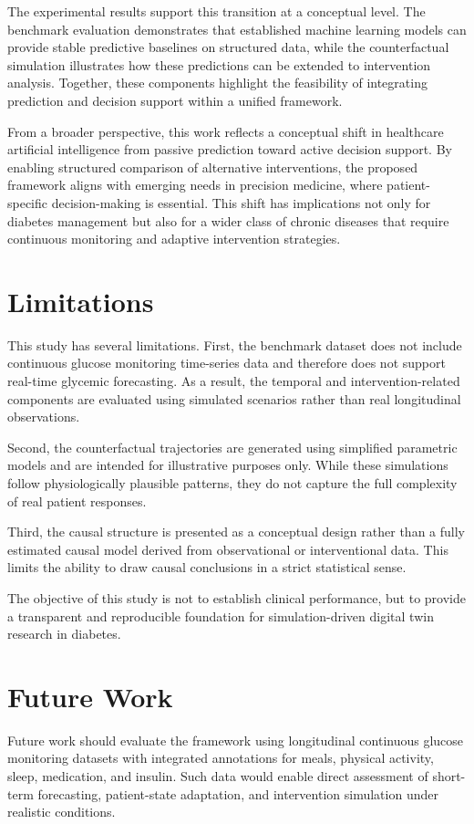 \documentclass[journal]{IEEEtran}
\begin{document}
The experimental results support this transition at a conceptual level. The benchmark evaluation demonstrates that established machine learning models can provide stable predictive baselines on structured data, while the counterfactual simulation illustrates how these predictions can be extended to intervention analysis. Together, these components highlight the feasibility of integrating prediction and decision support within a unified framework.

From a broader perspective, this work reflects a conceptual shift in healthcare artificial intelligence from passive prediction toward active decision support. By enabling structured comparison of alternative interventions, the proposed framework aligns with emerging needs in precision medicine, where patient-specific decision-making is essential. This shift has implications not only for diabetes management but also for a wider class of chronic diseases that require continuous monitoring and adaptive intervention strategies.

\section{Limitations}
This study has several limitations. First, the benchmark dataset does not include continuous glucose monitoring time-series data and therefore does not support real-time glycemic forecasting. As a result, the temporal and intervention-related components are evaluated using simulated scenarios rather than real longitudinal observations.

Second, the counterfactual trajectories are generated using simplified parametric models and are intended for illustrative purposes only. While these simulations follow physiologically plausible patterns, they do not capture the full complexity of real patient responses.

Third, the causal structure is presented as a conceptual design rather than a fully estimated causal model derived from observational or interventional data. This limits the ability to draw causal conclusions in a strict statistical sense.

The objective of this study is not to establish clinical performance, but to provide a transparent and reproducible foundation for simulation-driven digital twin research in diabetes.

\section{Future Work}
Future work should evaluate the framework using longitudinal continuous glucose monitoring datasets with integrated annotations for meals, physical activity, sleep, medication, and insulin. Such data would enable direct assessment of short-term forecasting, patient-state adaptation, and intervention simulation under realistic conditions.
\end{document}
